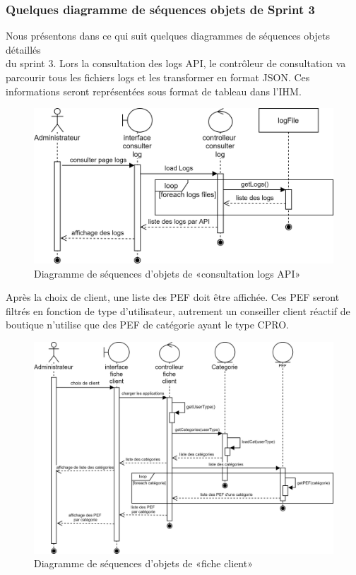 \subsubsection{Quelques diagramme de séquences objets de Sprint 3}
Nous présentons dans ce qui suit quelques diagrammes de séquences objets détaillés \\du sprint 3.
Lors la consultation des logs API, le contrôleur de consultation va parcourir tous les fichiers logs et les transformer en format JSON. Ces informations seront représentées sous format de tableau dans l'IHM. 
	\begin{figure}[H]
		\centering
		\includegraphics[width=0.7\linewidth]{"img/conception/sequences/sprint 3/log-api-obj"}
		\caption[Diagramme de séquences d’objets de «consultation logs API»]{Diagramme de séquences d’objets de «consultation logs API»}
		\label{fig:log-api-obj}
	\end{figure}
	\newpage
{} 
Après la choix de client, une liste des PEF doit être affichée. Ces PEF seront filtrés en fonction de type d'utilisateur, autrement un conseiller client réactif de boutique n'utilise que des PEF de catégorie ayant le type CPRO. 
	\begin{figure}[H]
		\centering
		\includegraphics[width=0.7\linewidth]{"img/conception/sequences/sprint 3/fiche-client-obj"}
		\caption[Diagramme de séquences d’objets de «fiche client»]{Diagramme de séquences d’objets de «fiche client»}
		\label{fig:fiche-client-obj}
	\end{figure}

